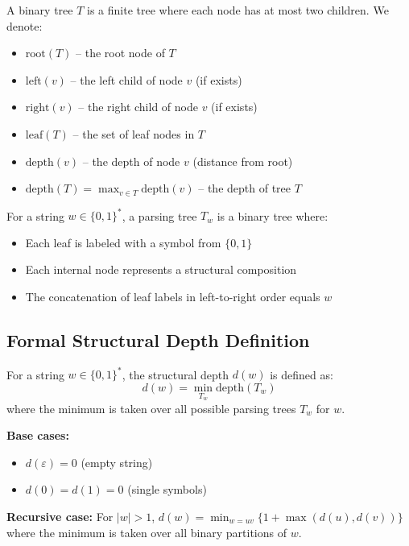 \begin{definition}
A binary tree $T$ is a finite tree where each node has at most two children. We denote:
\begin{itemize}
\item $\text{root}(T)$ -- the root node of $T$
\item $\text{left}(v)$ -- the left child of node $v$ (if exists)
\item $\text{right}(v)$ -- the right child of node $v$ (if exists)
\item $\text{leaf}(T)$ -- the set of leaf nodes in $T$
\item $\text{depth}(v)$ -- the depth of node $v$ (distance from root)
\item $\text{depth}(T) = \max_{v \in T} \text{depth}(v)$ -- the depth of tree $T$
\end{itemize}
\end{definition}

\begin{definition}
For a string $w \in \{0,1\}^*$, a parsing tree $T_w$ is a binary tree where:
\begin{itemize}
\item Each leaf is labeled with a symbol from $\{0,1\}$
\item Each internal node represents a structural composition
\item The concatenation of leaf labels in left-to-right order equals $w$
\end{itemize}
\end{definition}

\subsection{Formal Structural Depth Definition}

\begin{definition}
For a string $w \in \{0,1\}^*$, the structural depth $d(w)$ is defined as:
$$d(w) = \min_{T_w} \text{depth}(T_w)$$
where the minimum is taken over all possible parsing trees $T_w$ for $w$.

\textbf{Base cases:}
\begin{itemize}
\item $d(\varepsilon) = 0$ (empty string)
\item $d(0) = d(1) = 0$ (single symbols)
\end{itemize}

\textbf{Recursive case:}
For $|w| > 1$, $d(w) = \min_{w=uv} \{1 + \max(d(u), d(v))\}$ where the minimum is taken over all binary partitions of $w$.
\end{definition}

